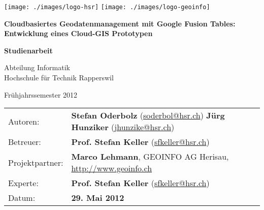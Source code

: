 \begin{titlepage}

\texttt{[image: ./images/logo-hsr]}
\hfill
\texttt{[image: ./images/logo-geoinfo]}
\vspace{2cm}

\begin{center}
{ \Large
	\textbf{Cloudbasiertes Geodatenmanagement mit Google Fusion Tables: Entwicklung eines Cloud-GIS Prototypen}
	\vspace{1cm}

	\textbf{Studienarbeit}
	\vspace{1cm}

	Abteilung Informatik \\[0.2cm]
	Hochschule für Technik Rapperswil
	\vspace{1cm}

	Frühjahrssemester 2012
}
\end{center}
\vspace{1cm}

\begin{tabular}{p{0.19\twocelltabwidth}p{0.81\twocelltabwidth}}
Autoren: & \textbf{Stefan Oderbolz} (\url{soderbol@hsr.ch}) \newline
 \textbf{Jürg Hunziker} (\url{jhunzike@hsr.ch}) \\ 
Betreuer: & \textbf{Prof. Stefan Keller} (\url{sfkeller@hsr.ch}) \\ 
Projektpartner: & \textbf{Marco Lehmann}, GEOINFO AG Herisau, \url{http://www.geoinfo.ch} \\ 
Experte: & \textbf{Prof. Stefan Keller} (\url{sfkeller@hsr.ch}) \\ 
Datum: & \textbf{29. Mai 2012} \\ 
\end{tabular}

\end{titlepage}